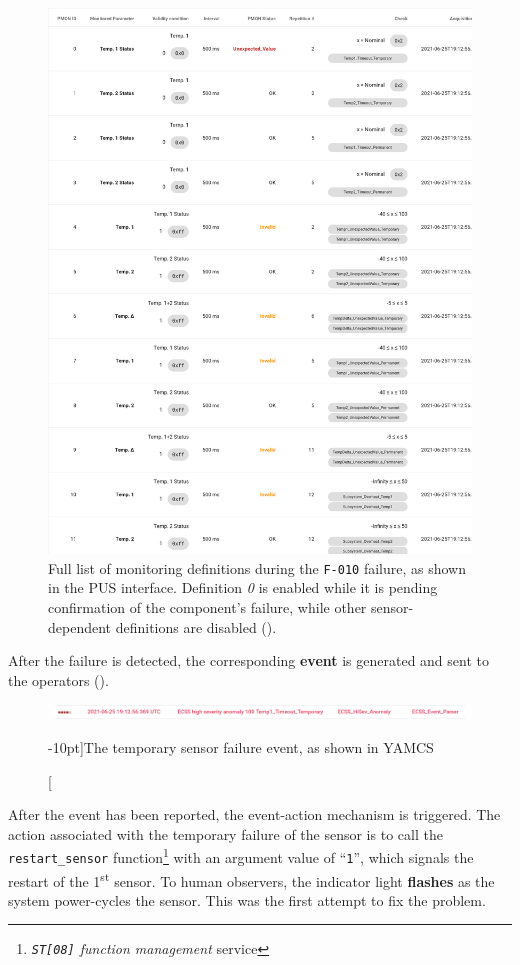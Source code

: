 \documentclass[a4paper,nobib,final]{tufte-book}
\begin{document}
\begin{figure}
\centering
\caption[Full list of monitoring definitions during the \texttt{F-010} failure]{Full list of monitoring definitions during the \texttt{F-010} failure, as shown in the \acs{PUS} interface. Definition \emph{0} is enabled while it is pending confirmation of the component's failure, while other sensor-dependent definitions are disabled (\invalid).}
\label{fig:pusf010moni}
\includegraphics[width=.8\textwidth]{media/screenshots/pus_f010_moni}
\end{figure}

After the failure is detected, the corresponding \textbf{event} is generated and sent to the operators ().
		
\begin{figure}
\centering
\includegraphics{media/screenshots/yamcs_f010_event}
\caption[][-10pt]{The temporary sensor failure event, as shown in \acs{YAMCS}}
\label{fig:yamcsf010event}
\end{figure}

After the event has been reported, the event-action mechanism is triggered. The action associated with the temporary failure of the sensor is to call the \texttt{restart\_sensor} function\footnote{\emph{\texttt{ST[08]} function management} service} with an argument value of ``\texttt{1}'', which signals the restart of the 1\textsuperscript{st} sensor. To human observers, the indicator light \textbf{flashes} as the system power-cycles the sensor. This was the first attempt to fix the problem.
	
\end{document}
